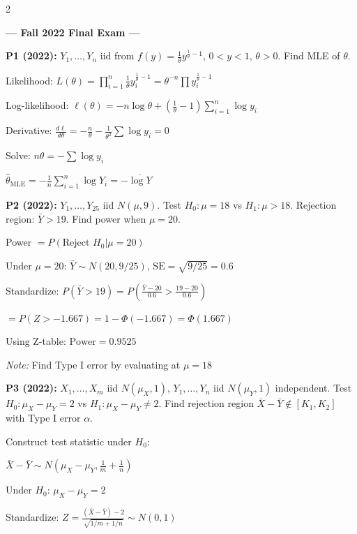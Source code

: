 \documentclass[10pt,letterpaper]{article}
\begin{document}
\begin{multicols}{2}

\begin{center}
\textbf{--- Fall 2022 Final Exam ---}
\end{center}

\textbf{P1 (2022):} $Y_1, \ldots, Y_n$ iid from $f(y) = \frac{1}{\theta}y^{\frac{1}{\theta}-1}$, $0 < y < 1$, $\theta > 0$. Find MLE of $\theta$.

Likelihood: $L(\theta) = \prod_{i=1}^n \frac{1}{\theta}y_i^{\frac{1}{\theta}-1} = \theta^{-n} \prod y_i^{\frac{1}{\theta}-1}$

Log-likelihood: $\ell(\theta) = -n\log\theta + (\frac{1}{\theta} - 1)\sum_{i=1}^n \log y_i$

Derivative: $\frac{d\ell}{d\theta} = -\frac{n}{\theta} - \frac{1}{\theta^2}\sum \log y_i = 0$

Solve: $n\theta = -\sum \log y_i$

$\boxed{\hat{\theta}_{\text{MLE}} = -\frac{1}{n}\sum_{i=1}^n \log Y_i = -\overline{\log Y}}$

\textbf{P2 (2022):} $Y_1, \ldots, Y_{25}$ iid $N(\mu, 9)$. Test $H_0: \mu = 18$ vs $H_1: \mu > 18$. Rejection region: $\bar{Y} > 19$. Find power when $\mu=20$.

Power $= P(\text{Reject } H_0 | \mu = 20)$

Under $\mu=20$: $\bar{Y} \sim N(20, 9/25)$, $\text{SE} = \sqrt{9/25} = 0.6$

Standardize: $P(\bar{Y} > 19) = P\left(\frac{\bar{Y}-20}{0.6} > \frac{19-20}{0.6}\right)$

$= P(Z > -1.667) = 1 - \Phi(-1.667) = \Phi(1.667)$

Using Z-table: $\boxed{\text{Power} = 0.9525}$

\textit{Note:} Find Type I error by evaluating at $\mu=18$

\textbf{P3 (2022):} $X_1, \ldots, X_m$ iid $N(\mu_X, 1)$, $Y_1, \ldots, Y_n$ iid $N(\mu_Y, 1)$ independent. Test $H_0: \mu_X - \mu_Y = 2$ vs $H_1: \mu_X - \mu_Y \neq 2$. Find rejection region $\bar{X} - \bar{Y} \notin [K_1, K_2]$ with Type I error $\alpha$.

Construct test statistic under $H_0$:

$\bar{X} - \bar{Y} \sim N(\mu_X - \mu_Y, \frac{1}{m} + \frac{1}{n})$

Under $H_0$: $\mu_X - \mu_Y = 2$

Standardize: $Z = \frac{(\bar{X}-\bar{Y}) - 2}{\sqrt{1/m + 1/n}} \sim N(0,1)$


\end{multicols}
\end{document}
